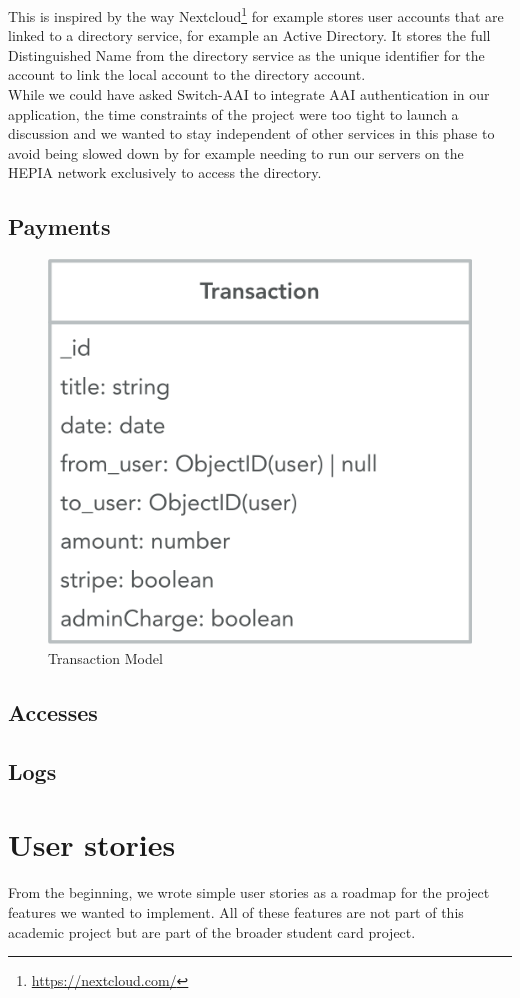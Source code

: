 \documentclass[11pt,a4paper]{report}
\begin{document}
This is inspired by the way Nextcloud\footnote{\url{https://nextcloud.com/}} for example stores user accounts that are linked to a directory service, for example an Active Directory. It stores the full Distinguished Name from the directory service as the unique identifier for the account to link the local account to the directory account.\\

While we could have asked Switch-AAI to integrate AAI authentication in our application, the time constraints of the project were too tight to launch a discussion and we wanted to stay independent of other services in this phase to avoid being slowed down by for example needing to run our servers on the HEPIA network exclusively to access the directory.
\subsection{Payments}
\begin{figure}[H]
\begin{center}
	\includegraphics[width=.4\textwidth]{assets/transaction_model}
	\caption{Transaction Model}
\end{center}
\end{figure}

\subsection{Accesses}

\subsection{Logs}

\section{User stories}
From the beginning, we wrote simple user stories as a roadmap for the project features we wanted to implement. All of these features are not part of this academic project but are part of the broader student card project. 
\end{document}
